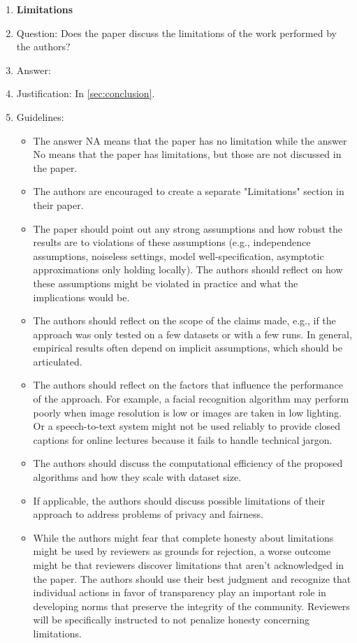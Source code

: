 \documentclass{article}
\begin{document}
\begin{enumerate}
\item {\bf Limitations}
    \item[] Question: Does the paper discuss the limitations of the work performed by the authors?
    \item[] Answer: \answerYes{} %
    \item[] Justification: In \cref{sec:conclusion}.
    \item[] Guidelines:
    \begin{itemize}
        \item The answer NA means that the paper has no limitation while the answer No means that the paper has limitations, but those are not discussed in the paper. 
        \item The authors are encouraged to create a separate "Limitations" section in their paper.
        \item The paper should point out any strong assumptions and how robust the results are to violations of these assumptions (e.g., independence assumptions, noiseless settings, model well-specification, asymptotic approximations only holding locally). The authors should reflect on how these assumptions might be violated in practice and what the implications would be.
        \item The authors should reflect on the scope of the claims made, e.g., if the approach was only tested on a few datasets or with a few runs. In general, empirical results often depend on implicit assumptions, which should be articulated.
        \item The authors should reflect on the factors that influence the performance of the approach. For example, a facial recognition algorithm may perform poorly when image resolution is low or images are taken in low lighting. Or a speech-to-text system might not be used reliably to provide closed captions for online lectures because it fails to handle technical jargon.
        \item The authors should discuss the computational efficiency of the proposed algorithms and how they scale with dataset size.
        \item If applicable, the authors should discuss possible limitations of their approach to address problems of privacy and fairness.
        \item While the authors might fear that complete honesty about limitations might be used by reviewers as grounds for rejection, a worse outcome might be that reviewers discover limitations that aren't acknowledged in the paper. The authors should use their best judgment and recognize that individual actions in favor of transparency play an important role in developing norms that preserve the integrity of the community. Reviewers will be specifically instructed to not penalize honesty concerning limitations.
    \end{itemize}


\end{enumerate}
\end{document}
